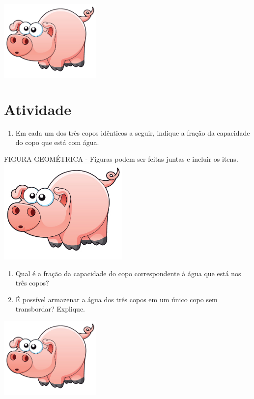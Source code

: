 \documentclass[a4,12pt]{book}
\begin{document}
\includegraphics[width=\textwidth,height=4cm, keepaspectratio]{pig}
\section{Atividade}







\begin{enumerate} [\quad a)] %
  \item     Em cada um dos três copos idênticos a seguir, indique a fração da capacidade do copo que está com água. 
\end{enumerate} %
\mbox{} \newline   \begin{imagem*}[breakable]{}{}   FIGURA GEOMÉTRICA - Figuras podem ser feitas juntas e incluir  os itens.      \includegraphics[width=180pt, keepaspectratio]{pig}   \end{imagem*}
\begin{enumerate} [\quad a)] %
  \item     Qual é a fração da capacidade do copo correspondente à água que está nos três copos?
  \item     É possível armazenar a água dos três copos em um único copo sem transbordar? Explique.
\end{enumerate} %







\includegraphics[width=\textwidth,height=4cm, keepaspectratio]{pig}
\end{document}
